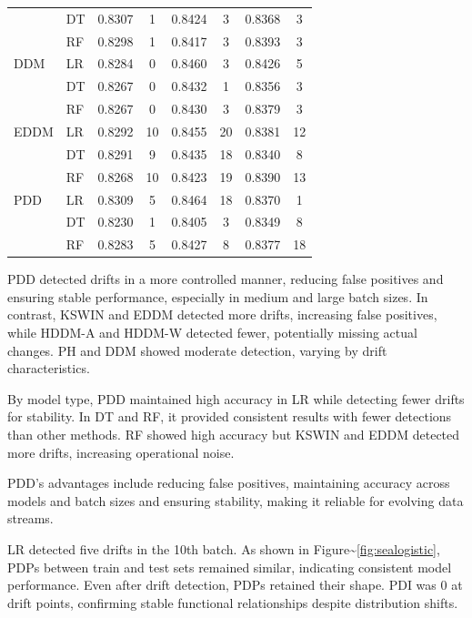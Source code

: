 \begin{table}[H]
\begin{tabular}{llcccccc}
        & DT & 0.8307 & 1 & 0.8424 & 3 & 0.8368 & 3 \\
        & RF & 0.8298 & 1 & 0.8417 & 3 & 0.8393 & 3 \\
        \midrule
        DDM & LR & 0.8284 & 0 & 0.8460 & 3 & 0.8426 & 5 \\
        & DT & 0.8267 & 0 & 0.8432 & 1 & 0.8356 & 3 \\
        & RF & 0.8267 & 0 & 0.8430 & 3 & 0.8379 & 3 \\
        \midrule
        EDDM & LR & 0.8292 & 10 & 0.8455 & 20 & 0.8381 & 12 \\
        & DT & 0.8291 & 9 & 0.8435 & 18 & 0.8340 & 8 \\
        & RF & 0.8268 & 10 & 0.8423 & 19 & 0.8390 & 13 \\
        \midrule
        PDD & LR & 0.8309 & 5 & 0.8464 & 18 & 0.8370 & 1 \\
        & DT & 0.8230 & 1 & 0.8405 & 3 & 0.8349 & 8 \\
        & RF & 0.8283 & 5 & 0.8427 & 8 & 0.8377 & 18 \\
        \midrule
    \end{tabular}
\end{table}

PDD detected drifts in a more controlled manner, reducing false positives and ensuring stable performance, especially in medium and large batch sizes. In contrast, KSWIN and EDDM detected more drifts, increasing false positives, while HDDM-A and HDDM-W detected fewer, potentially missing actual changes. PH and DDM showed moderate detection, varying by drift characteristics.

By model type, PDD maintained high accuracy in LR while detecting fewer drifts for stability. In DT and RF, it provided consistent results with fewer detections than other methods. RF showed high accuracy but KSWIN and EDDM detected more drifts, increasing operational noise.

PDD's advantages include reducing false positives, maintaining accuracy across models and batch sizes and ensuring stability, making it reliable for evolving data streams.

LR detected five drifts in the 10th batch. As shown in Figure\textasciitilde{}\ref{fig:sealogistic}, PDPs between train and test sets remained similar, indicating consistent model performance. Even after drift detection, PDPs retained their shape. PDI was 0 at drift points, confirming stable functional relationships despite distribution shifts.

